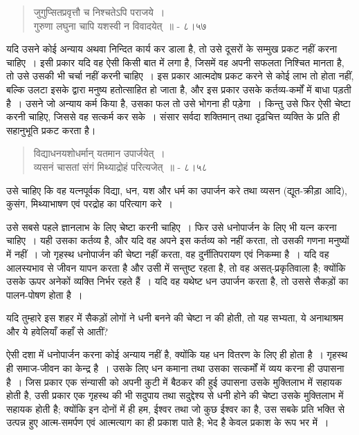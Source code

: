 \begin{verse}
जुगुप्सितप्रवृत्तौ च निश्चतेऽपि पराजये~।\\ गुरुणा लघुना चापि यशस्वी न विवादयेत्~॥ - ८।५७
\end{verse}

यदि उसने कोई अन्याय अथवा निन्दित कार्य कर डाला है, तो उसे दूसरों के सम्मुख प्रकट नहीं करना चाहिए~। इसी प्रकार यदि वह ऐसी किसी बात में लगा है, जिसमें वह अपनी सफलता निश्चित मानता है, तो उसे उसकी भी चर्चा नहीं करनी चाहिए~। इस प्रकार आत्मदोष प्रकट करने से कोई लाभ तो होता नहीं, बल्कि उलटा इसके द्वारा मनुष्य हतोत्साहित हो जाता है, और इस प्रकार उसके कर्तव्य-कर्मों में बाधा पड़ती है~। उसने जो अन्याय कर्म किया है, उसका फल तो उसे भोगना ही पड़ेगा~। किन्तु उसे फिर ऐसी चेष्टा करनी चाहिए, जिससे वह सत्कर्म कर सके~। संसार सर्वदा शक्तिमान् तथा दृढ़चित्त व्यक्ति के प्रति ही सहानुभूति प्रकट करता है।

\begin{verse}
विद्याधनयशोधर्मान् यतमान उपार्जयेत्~।\\ व्यसनं चासतां संगं मिथ्याद्रोहं परित्यजेत्~॥ - ८।५८
\end{verse}

उसे चाहिए कि वह यत्नपूर्वक विद्या, धन, यश और धर्म का उपार्जन करे तथा व्यसन (द्यूत-क्रीड़ा आदि), कुसंग, मिथ्याभाषण एवं परद्रोह का परित्याग करे~।

उसे सबसे पहले ज्ञानलाभ के लिए चेष्टा करनी चाहिए~। फिर उसे धनोपार्जन के लिए भी यत्न करना चाहिए~। यही उसका कर्तव्य है, और यदि वह अपने इस कर्तव्य को नहीं करता, तो उसकी गणना मनुष्यों में नहीं~। जो गृहस्थ धनोपार्जन की चेष्टा नहीं करता, वह दुर्नीतिपरायण एवं निकम्मा है~। यदि वह आलस्यभाव से जीवन यापन करता है और उसी में सन्तुष्ट रहता है, तो वह असत्-प्रकृतिवाला है; क्योंकि उसके ऊपर अनेकों व्यक्ति निर्भर रहते हैं~। यदि वह यथेष्ट धन उपार्जन करता है, तो उससे सैकड़ों का पालन-पोषण होता है~।

यदि तुम्हारे इस शहर में सैकड़ों लोगों ने धनी बनने की चेष्टा न की होती, तो यह सभ्यता, ये अनाथाश्रम और ये हवेलियाँ कहाँ से आतीं?

ऐसी दशा में धनोपार्जन करना कोई अन्याय नहीं है, क्योंकि यह धन वितरण के लिए ही होता है~। गृहस्थ ही समाज-जीवन का केन्द्र है~। उसके लिए धन कमाना तथा उसका सत्कर्मों में व्यय करना ही उपासना है~। जिस प्रकार एक संन्यासी को अपनी कुटी में बैठकर की हुई उपासना उसके मुक्तिलाभ में सहायक होती है, उसी प्रकार एक गृहस्थ की भी सदुपाय तथा सदुद्देश्य से धनी होने की चेष्टा उसके मुक्तिलाभ में सहायक होती है; क्योंकि इन दोनों में ही हम, ईश्वर तथा जो कुछ ईश्वर का है, उस सबके प्रति भक्ति से उत्पन्न हुए आत्म-समर्पण एवं आत्मत्याग का ही प्रकाश पाते है; भेद है केवल प्रकाश के रूप भर में~।

